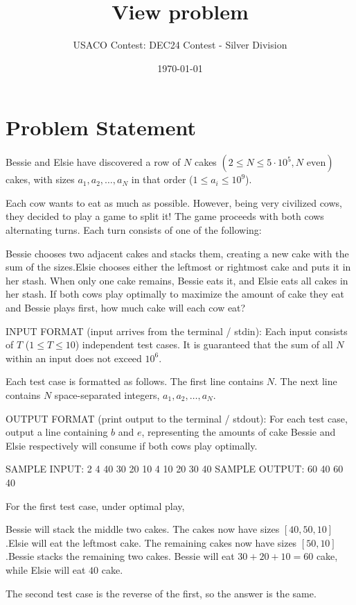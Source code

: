 \documentclass[12pt]{article}
\title{View problem}
\author{USACO Contest: DEC24 Contest - Silver Division}
\date{\today}
\begin{document}
\maketitle

\section*{Problem Statement}


Bessie and Elsie have discovered a row of $N$ cakes
$(2 \leq N \leq 5\cdot 10^5, N \text{ even})$ cakes, with sizes
$a_1,a_2,\dots,a_N$ in that order ($1\le a_i\le 10^9$).

Each cow wants to eat as much as possible.  However, being very civilized cows,
they decided to play a game to split it! The game proceeds with both cows
alternating turns. Each turn consists of one of the following:

Bessie chooses two adjacent cakes and stacks them, creating a new cake with
the sum of the sizes.Elsie chooses either the leftmost or rightmost cake and puts it in her
stash.
When only one cake remains, Bessie eats it, and Elsie eats all cakes in her
stash. If both cows play optimally to maximize the amount of cake they eat and
Bessie plays first, how much cake will each cow eat?

INPUT FORMAT (input arrives from the terminal / stdin):
Each input consists of $T$ ($1\le T\le 10$) independent test cases. It is
guaranteed that the sum of all $N$ within an input does not exceed $10^6$.

Each test case is formatted as follows. The first line contains $N$. The next
line contains $N$ space-separated integers, $a_1,a_2,\ldots,a_N$.

OUTPUT FORMAT (print output to the terminal / stdout):
For each test case, output a line containing $b$ and $e$, representing the
amounts of cake Bessie and Elsie respectively will consume if both cows play
optimally.

SAMPLE INPUT:
2
4
40 30 20 10
4
10 20 30 40
SAMPLE OUTPUT: 
60 40
60 40

For the first test case, under optimal play,

Bessie will stack the middle two cakes. The cakes now have sizes
$[40,50,10]$.Elsie will eat the leftmost cake. The remaining cakes now
have sizes
$[50,10]$.Bessie stacks the remaining two cakes.
Bessie will eat $30+20+10=60$ cake, while Elsie will eat $40$ cake.

The second test case is the reverse of the first, so the answer is the same.
\end{document}
